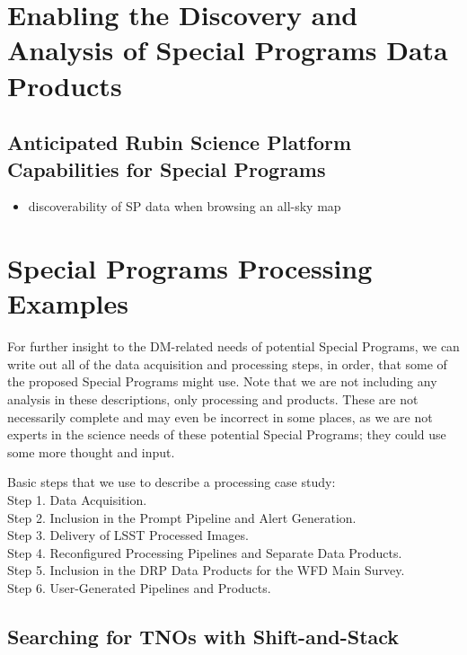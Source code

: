 \documentclass[DM,lsstdoc,toc]{lsstdoc}
\begin{document}
\clearpage
\section{Enabling the Discovery and Analysis of Special Programs Data Products}\label{sec:analysis}

\subsection{Anticipated Rubin Science Platform Capabilities for Special Programs }

\begin{itemize}
\item discoverability of SP data when browsing an all-sky map
\end{itemize}





\clearpage
\section{Special Programs Processing Examples}\label{sec:SPCS}

For further insight to the DM-related needs of potential Special Programs, we can write out all of the data acquisition and processing steps, in order, that some of the proposed Special Programs might use.
Note that we are not including any analysis in these descriptions, only processing and products. These are not necessarily complete and may even be incorrect in some places, as we are not experts in the science needs of these potential Special Programs; they could use some more thought and input.

Basic steps that we use to describe a processing case study: \\
Step 1. Data Acquisition. \\
Step 2. Inclusion in the Prompt Pipeline and Alert Generation. \\
Step 3. Delivery of LSST Processed Images. \\
Step 4. Reconfigured Processing Pipelines and Separate Data Products. \\
Step 5. Inclusion in the DRP Data Products for the WFD Main Survey. \\
Step 6. User-Generated Pipelines and Products. \\

\subsection{Searching for TNOs with Shift-and-Stack}\label{ssec:SPCS_TNO}
\end{document}
